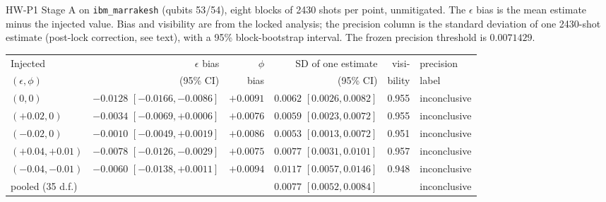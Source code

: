 \documentclass[10pt,twocolumn]{article}
\theoremstyle{definition}
\theoremstyle{remark}
\newcommand{\eps}{\epsilon}
\begin{document}
\begin{widetable}[t]
\centering\footnotesize\setlength{\tabcolsep}{5pt}
\caption{HW-P1 Stage A on \texttt{ibm\_marrakesh} (qubits 53/54), eight blocks of 2430 shots per point, unmitigated. The $\eps$ bias is the mean estimate minus the injected value. Bias and visibility are from the locked analysis; the precision column is the standard deviation of one 2430-shot estimate (post-lock correction, see text), with a 95\% block-bootstrap interval. The frozen precision threshold is $0.0071429$.}\label{tab:hw}
\begin{tabular}{@{}lrrrrl@{}}
\toprule
Injected & $\eps$ bias & $\phi$ & SD of one estimate & visi- & precision \\
$(\eps,\phi)$ & (95\% CI) & bias & (95\% CI) & bility & label \\
\midrule
$(0,0)$ & $-0.0128$ $[-0.0166,-0.0086]$ & $+0.0091$ & $0.0062$ $[0.0026,0.0082]$ & 0.955 & inconclusive \\
$(+0.02,0)$ & $-0.0034$ $[-0.0069,+0.0006]$ & $+0.0076$ & $0.0059$ $[0.0023,0.0072]$ & 0.955 & inconclusive \\
$(-0.02,0)$ & $-0.0010$ $[-0.0049,+0.0019]$ & $+0.0086$ & $0.0053$ $[0.0013,0.0072]$ & 0.951 & inconclusive \\
$(+0.04,+0.01)$ & $-0.0078$ $[-0.0126,-0.0029]$ & $+0.0075$ & $0.0077$ $[0.0031,0.0101]$ & 0.957 & inconclusive \\
$(-0.04,-0.01)$ & $-0.0060$ $[-0.0138,+0.0011]$ & $+0.0094$ & $0.0117$ $[0.0057,0.0146]$ & 0.948 & inconclusive \\
\midrule
pooled (35 d.f.) & & & $0.0077$ $[0.0052,0.0084]$ & & inconclusive \\
\bottomrule
\end{tabular}
\end{widetable}
\end{document}
